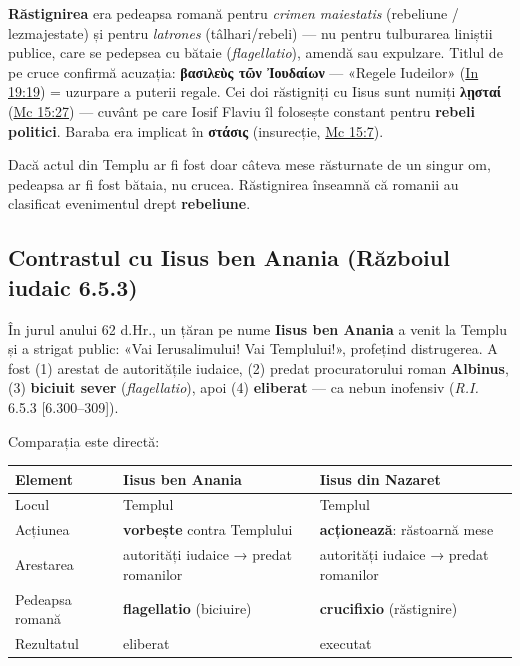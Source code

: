 \documentclass[12pt,a4paper,twoside,openany]{book}
\begin{document}
\textbf{Răstignirea} era pedeapsa romană pentru \textit{crimen maiestatis} (rebeliune / lezmajestate) și pentru \textit{latrones} (tâlhari/rebeli) — nu pentru tulburarea liniștii publice, care se pedepsea cu bătaie (\textit{flagellatio}), amendă sau expulzare. Titlul de pe cruce confirmă acuzația: \textbf{βασιλεὺς τῶν Ἰουδαίων} — «Regele Iudeilor» (\href{https://bibliaortodoxa.ro/carte.php?id=35\&cap=19\#19}{In 19:19}) = uzurpare a puterii regale. Cei doi răstigniți cu Iisus sunt numiți \textbf{λῃσταί} (\href{https://bibliaortodoxa.ro/carte.php?id=53\&cap=15\#27}{Mc 15:27}) — cuvânt pe care Iosif Flaviu îl folosește constant pentru \textbf{rebeli politici}. Baraba era implicat în \textbf{στάσις} (insurecție, \href{https://bibliaortodoxa.ro/carte.php?id=53\&cap=15\#7}{Mc 15:7}).

Dacă actul din Templu ar fi fost doar câteva mese răsturnate de un singur om, pedeapsa ar fi fost bătaia, nu crucea. Răstignirea înseamnă că romanii au clasificat evenimentul drept \textbf{rebeliune}.

\subsection{Contrastul cu Iisus ben Anania (Războiul iudaic 6.5.3)}

În jurul anului 62 d.Hr., un țăran pe nume \textbf{Iisus ben Anania} a venit la Templu și a strigat public: «Vai Ierusalimului! Vai Templului!», profețind distrugerea. A fost (1) arestat de autoritățile iudaice, (2) predat procuratorului roman \textbf{Albinus}, (3) \textbf{biciuit sever} (\textit{flagellatio}), apoi (4) \textbf{eliberat} — ca nebun inofensiv (\textit{R.I.} 6.5.3 [6.300--309]).

Comparația este directă:

\begin{center}
\small
\begin{tabularx}{\textwidth}{L{3.5cm}L{5cm}X}
\toprule
{}
\textbf{Element} & \textbf{Iisus ben Anania} & \textbf{Iisus din Nazaret} \\
\midrule
Locul & Templul & Templul \\
Acțiunea & \textbf{vorbește} contra Templului & \textbf{acționează}: răstoarnă mese \\
Arestarea & autorități iudaice → predat romanilor & autorități iudaice → predat romanilor \\
Pedeapsa romană & \textbf{flagellatio} (biciuire) & \textbf{crucifixio} (răstignire) \\
Rezultatul & eliberat & executat \\
\bottomrule
\end{tabularx}
\end{center}
\end{document}
